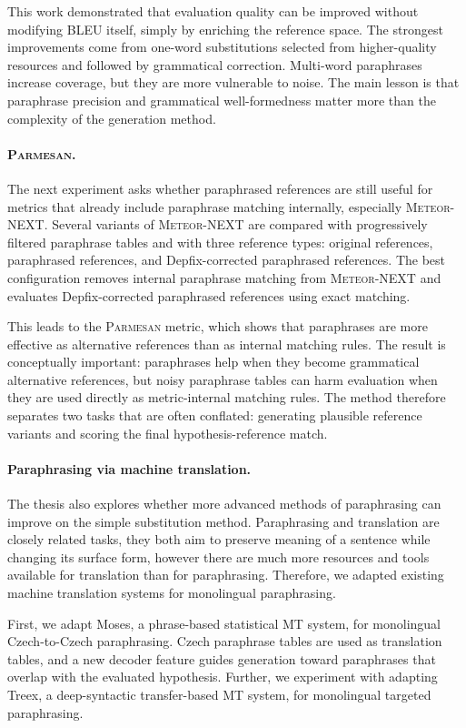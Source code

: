 \documentclass[12pt,a4paper]{report}
\newcommand{\bleu}{\textsc{BLEU}\xspace}
\newcommand{\mn}{\textsc{Meteor-NEXT}\xspace}
\newcommand{\parmesan}{\textsc{Parmesan}\xspace}
\begin{document}
This work demonstrated that evaluation quality can be improved without modifying \bleu 
itself, simply by enriching the reference space. The strongest improvements come from 
one-word substitutions selected from higher-quality resources and followed by grammatical 
correction. Multi-word paraphrases increase coverage, but they are more vulnerable to 
noise. The main lesson is that paraphrase precision and grammatical well-formedness 
matter more than the complexity of the generation method.

\paragraph{\parmesan.}
The next experiment asks whether paraphrased references are still useful for metrics 
that already include paraphrase matching internally, especially \mn. Several variants 
of \mn are compared with progressively filtered paraphrase tables and with three reference 
types: original references, paraphrased references, and Depfix-corrected paraphrased 
references. The best configuration removes internal paraphrase matching from \mn and 
evaluates Depfix-corrected paraphrased references using exact matching.

This leads to the \parmesan metric, which shows that paraphrases are more effective 
as alternative references than as internal matching rules. The result is conceptually 
important: paraphrases help when they become grammatical alternative references, but
noisy paraphrase tables can harm evaluation when they are used directly as metric-internal 
matching rules. The method therefore separates two tasks that are often conflated: 
generating plausible reference variants and scoring the final hypothesis-reference match.


\paragraph{Paraphrasing via machine translation.}
The thesis also explores whether more advanced methods of paraphrasing can improve on 
the simple substitution method. Paraphrasing and translation are closely related tasks, 
they both aim to preserve meaning of a sentence while changing its surface form, however
there are much more resources and tools available for translation than for paraphrasing.
Therefore, we adapted existing machine translation systems for monolingual paraphrasing. 

First, we adapt Moses, a phrase-based statistical MT system, for monolingual Czech-to-Czech 
paraphrasing. Czech paraphrase tables are used as translation tables, and a new decoder 
feature guides generation toward paraphrases that overlap with the evaluated hypothesis. 
Further, we experiment with adapting Treex, a deep-syntactic transfer-based MT system, 
for monolingual targeted paraphrasing.
\end{document}
